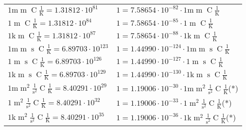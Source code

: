 \begin{center}
\begin{longtable}{l l}
{\color{gray}$1 \bm{\mathrm{ m}}{\operatorname{m}}{}{\operatorname{C}}\frac1{\operatorname{K}} = 1.31812\cdot10^{81} $}   & {\color{gray}$ 1 = 7.58654\cdot10^{-82} \cdot 1 \bm{\mathrm{ m}}{\operatorname{m}}{}{\operatorname{C}}\frac1{\operatorname{K}}$}  \\
{\color{black}$1 \bm{\mathrm{ }}{\operatorname{m}}{}{\operatorname{C}}\frac1{\operatorname{K}} = 1.31812\cdot10^{84} $}   & {\color{black}$ 1 = 7.58654\cdot10^{-85} \cdot 1 \bm{\mathrm{ }}{\operatorname{m}}{}{\operatorname{C}}\frac1{\operatorname{K}}$}  \\
{\color{gray}$1 \bm{\mathrm{ k}}{\operatorname{m}}{}{\operatorname{C}}\frac1{\operatorname{K}} = 1.31812\cdot10^{87} $}   & {\color{gray}$ 1 = 7.58654\cdot10^{-88} \cdot 1 \bm{\mathrm{ k}}{\operatorname{m}}{}{\operatorname{C}}\frac1{\operatorname{K}}$}  \\
{\color{gray}$1 \bm{\mathrm{ m}}{\operatorname{m}}{\operatorname{s}}{\operatorname{C}}\frac1{\operatorname{K}} = 6.89703\cdot10^{123} $}   & {\color{gray}$ 1 = 1.44990\cdot10^{-124} \cdot 1 \bm{\mathrm{ m}}{\operatorname{m}}{\operatorname{s}}{\operatorname{C}}\frac1{\operatorname{K}}$}  \\
{\color{black}$1 \bm{\mathrm{ }}{\operatorname{m}}{\operatorname{s}}{\operatorname{C}}\frac1{\operatorname{K}} = 6.89703\cdot10^{126} $}   & {\color{black}$ 1 = 1.44990\cdot10^{-127} \cdot 1 \bm{\mathrm{ }}{\operatorname{m}}{\operatorname{s}}{\operatorname{C}}\frac1{\operatorname{K}}$}  \\
{\color{gray}$1 \bm{\mathrm{ k}}{\operatorname{m}}{\operatorname{s}}{\operatorname{C}}\frac1{\operatorname{K}} = 6.89703\cdot10^{129} $}   & {\color{gray}$ 1 = 1.44990\cdot10^{-130} \cdot 1 \bm{\mathrm{ k}}{\operatorname{m}}{\operatorname{s}}{\operatorname{C}}\frac1{\operatorname{K}}$}  \\
{\color{gray}$1 \bm{\mathrm{ m}}{\operatorname{m}^2}\frac1{\operatorname{s}^2}{\operatorname{C}}\frac1{\operatorname{K}} = 8.40291\cdot10^{29} $}   & {\color{gray}$ 1 = 1.19006\cdot10^{-30} \cdot 1 \bm{\mathrm{ m}}{\operatorname{m}^2}\frac1{\operatorname{s}^2}{\operatorname{C}}\frac1{\operatorname{K}}$}\quad(*)\\
{\color{black}$1 \bm{\mathrm{ }}{\operatorname{m}^2}\frac1{\operatorname{s}^2}{\operatorname{C}}\frac1{\operatorname{K}} = 8.40291\cdot10^{32} $}   & {\color{black}$ 1 = 1.19006\cdot10^{-33} \cdot 1 \bm{\mathrm{ }}{\operatorname{m}^2}\frac1{\operatorname{s}^2}{\operatorname{C}}\frac1{\operatorname{K}}$}\quad(*)\\
{\color{gray}$1 \bm{\mathrm{ k}}{\operatorname{m}^2}\frac1{\operatorname{s}^2}{\operatorname{C}}\frac1{\operatorname{K}} = 8.40291\cdot10^{35} $}   & {\color{gray}$ 1 = 1.19006\cdot10^{-36} \cdot 1 \bm{\mathrm{ k}}{\operatorname{m}^2}\frac1{\operatorname{s}^2}{\operatorname{C}}\frac1{\operatorname{K}}$}\quad(*)\\

\end{longtable}
\end{center}
